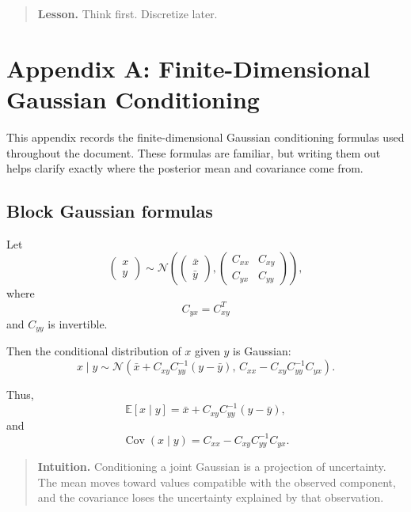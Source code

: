 \documentclass[11pt,a4paper]{book}
\newenvironment{intuition}
  {\begin{quote}\textbf{Intuition.}}
  {\end{quote}}
\newenvironment{lesson}
  {\begin{quote}\textbf{Lesson.}}
  {\end{quote}}
\begin{document}
\begin{lesson}
Think first.
Discretize later.
\end{lesson}


\appendix

\chapter{Appendix A: Finite-Dimensional Gaussian Conditioning}

This appendix records the finite-dimensional Gaussian conditioning formulas used
throughout the document. These formulas are familiar, but writing them out helps
clarify exactly where the posterior mean and covariance come from.

\section{Block Gaussian formulas}

Let
\[
    \begin{pmatrix}
        x\\
        y
    \end{pmatrix}
    \sim
    \mathcal{N}
    \left(
    \begin{pmatrix}
        \bar{x}\\
        \bar{y}
    \end{pmatrix},
    \begin{pmatrix}
        C_{xx} & C_{xy}\\
        C_{yx} & C_{yy}
    \end{pmatrix}
    \right),
\]
where
\[
    C_{yx}=C_{xy}^T
\]
and $C_{yy}$ is invertible.

Then the conditional distribution of $x$ given $y$ is Gaussian:
\[
    x\mid y
    \sim
    \mathcal{N}
    \left(
        \bar{x}
        +
        C_{xy}C_{yy}^{-1}(y-\bar{y}),
        \,
        C_{xx}
        -
        C_{xy}C_{yy}^{-1}C_{yx}
    \right).
\]

Thus,
\[
    \mathbb{E}[x\mid y]
    =
    \bar{x}
    +
    C_{xy}C_{yy}^{-1}(y-\bar{y}),
\]
and
\[
    \operatorname{Cov}(x\mid y)
    =
    C_{xx}
    -
    C_{xy}C_{yy}^{-1}C_{yx}.
\]

\begin{intuition}
Conditioning a joint Gaussian is a projection of uncertainty. The mean moves
toward values compatible with the observed component, and the covariance loses
the uncertainty explained by that observation.
\end{intuition}
\end{document}
